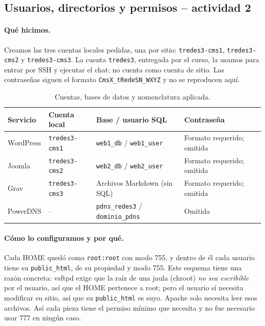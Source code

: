 \documentclass[11pt,a4paper]{article}
\begin{document}
\subsection{Usuarios, directorios y permisos -- actividad 2}
\paragraph{Qué hicimos.} Creamos las tres cuentas locales pedidas, una por sitio: \texttt{tredes3-cms1}, \texttt{tredes3-cms2} y \texttt{tredes3-cms3}. La cuenta \texttt{tredes3}, entregada por el curso, la usamos para entrar por SSH y ejecutar el chat; no cuenta como cuenta de sitio. Las contraseñas siguen el formato \texttt{CmsX\_tRedeSN\_WXYZ} y no se reproducen aquí.

\begin{table}[htbp]\centering\small
\caption{Cuentas, bases de datos y nomenclatura aplicada.}\label{tab:nomenclatura}
\begin{tabular}{@{}p{2.4cm}p{3.1cm}p{3.6cm}p{3.4cm}@{}}\toprule
Servicio & Cuenta local & Base / usuario SQL & Contraseña \\\midrule
WordPress & \texttt{tredes3-cms1} & \texttt{web1\_db} / \texttt{web1\_user} & Formato requerido; omitida \\
Joomla & \texttt{tredes3-cms2} & \texttt{web2\_db} / \texttt{web2\_user} & Formato requerido; omitida \\
Grav & \texttt{tredes3-cms3} & Archivos Markdown (sin SQL) & Formato requerido; omitida \\
PowerDNS & -- & \texttt{pdns\_redes3} / \texttt{dominio\_pdns} & Omitida \\
\bottomrule\end{tabular}
\end{table}

\paragraph{Cómo lo configuramos y por qué.} Cada HOME quedó como \texttt{root:root} con modo 755, y dentro de él cada usuario tiene su \texttt{public\_html}, de su propiedad y modo 755. Este esquema tiene una razón concreta: vsftpd exige que la raíz de una jaula (chroot) \emph{no sea escribible} por el usuario, así que el HOME pertenece a root; pero el usuario sí necesita modificar su sitio, así que su \texttt{public\_html} es suyo. Apache solo necesita leer esos archivos. Así cada pieza tiene el permiso mínimo que necesita y no fue necesario usar 777 en ningún caso.
\end{document}
